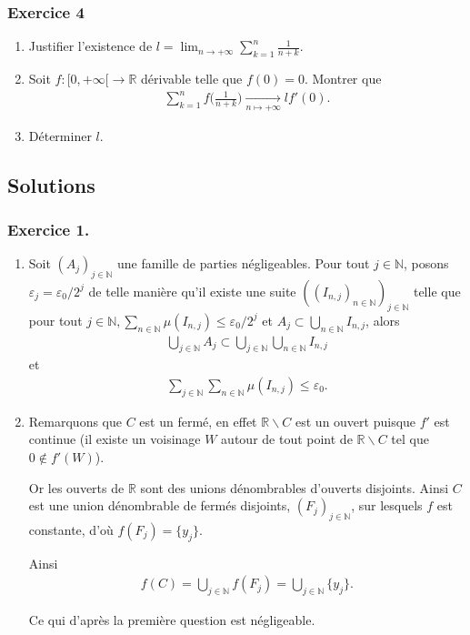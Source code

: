 \documentclass{article}
\begin{document}
\subsubsection*{Exercice 4}
\begin{enumerate}
\item Justifier l'existence de $\displaystyle l=\lim_{n\to+\infty} \sum_{k=1}^{n} \frac{1}{n+k}$.
\item Soit $f : [0,+\infty[ \to \mathbb{R}$ dérivable telle que $f(0)=0$. Montrer que 
\begin{align*}
\sum_{k=1}^{n}{f\bigg(\frac{1}{n+k}\bigg)} \xrightarrow[n\mapsto+\infty]{} lf'(0).
\end{align*}
\item Déterminer $l$.
\end{enumerate}
\subsection*{Solutions} 
\subsubsection*{Exercice 1.}
\begin{enumerate}
\item Soit $(A_j)_{j\in\mathbb{N}}$ une famille de parties négligeables. Pour tout $j\in\mathbb{N}$, posons $\varepsilon_j = \varepsilon_0/2^j$ de telle manière qu'il existe une suite $((I_{n,j})_{n\in\mathbb{N}})_{j\in\mathbb{N}}$ telle que pour tout $j\in\mathbb{N}, \sum_{n\in\mathbb{N}}\mu(I_{n,j})\leq \varepsilon_0/2^j$ et $A_j\subset \bigcup_{n\in\mathbb{N}}I_{n,j}$, alors 
\begin{align*}
\bigcup_{j\in\mathbb{N}}{A_j}\subset \bigcup_{j\in\mathbb{N}}\bigcup_{n\in\mathbb{N}}I_{n,j}
\end{align*}
et 
\begin{align*}
\sum_{j\in\mathbb{N}}{\sum_{n\in\mathbb{N}}}{\mu(I_{n,j})}\leq \varepsilon_0.
\end{align*}
\item Remarquons que $C$ est un fermé, en effet $\mathbb{R}\backslash C$ est un ouvert puisque $f'$ est continue (il existe un voisinage $W$ autour de tout point de $\mathbb{R}\backslash C$ tel que $0 \notin f'(W)$).

Or les ouverts de $\mathbb{R}$ sont des unions dénombrables d'ouverts disjoints. Ainsi $C$ est une union dénombrable de fermés disjoints, $(F_j)_{j\in\mathbb{N}}$, sur lesquels $f$ est constante, d'où $f(F_j)=\{y_j\}$.

Ainsi 
\begin{align*}
f(C) = \bigcup_{j\in\mathbb{N}}{f(F_j)}=\bigcup_{j\in\mathbb{N}}\{y_j\}.
\end{align*}

Ce qui d'après la première question est négligeable.
\end{enumerate}
\newpage{}
\end{document}
